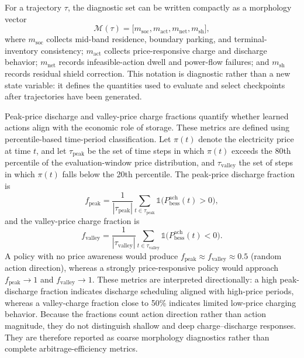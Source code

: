 For a trajectory $\tau$, the diagnostic set can be written compactly as a morphology vector
\begin{equation}
\mathcal{M}(\tau)=
\bigl[m_{\mathrm{soc}},m_{\mathrm{act}},m_{\mathrm{net}},m_{\mathrm{sh}}\bigr],
\label{eq:morphology_vector}
\end{equation}
where $m_{\mathrm{soc}}$ collects mid-band residence, boundary parking, and terminal-inventory consistency; $m_{\mathrm{act}}$ collects price-responsive charge and discharge behavior; $m_{\mathrm{net}}$ records infeasible-action dwell and power-flow failures; and $m_{\mathrm{sh}}$ records residual shield correction. This notation is diagnostic rather than a new state variable: it defines the quantities used to evaluate and select checkpoints after trajectories have been generated.

Peak-price discharge and valley-price charge fractions quantify whether learned actions align with the economic role of storage. These metrics are defined using percentile-based time-period classification. Let $\pi(t)$ denote the electricity price at time $t$, and let $\tau_{\mathrm{peak}}$ be the set of time steps in which $\pi(t)$ exceeds the 80th percentile of the evaluation-window price distribution, and $\tau_{\mathrm{valley}}$ the set of steps in which $\pi(t)$ falls below the 20th percentile. The peak-price discharge fraction is
\begin{equation}
f_{\mathrm{peak}} = \frac{1}{|\tau_{\mathrm{peak}}|} \sum_{t \in \tau_{\mathrm{peak}}} \mathbb{1}\bigl(P_{\mathrm{bess}}^{\mathrm{ach}}(t) > 0\bigr),
\label{eq:peak_discharge_fraction}
\end{equation}
and the valley-price charge fraction is
\begin{equation}
f_{\mathrm{valley}} = \frac{1}{|\tau_{\mathrm{valley}}|} \sum_{t \in \tau_{\mathrm{valley}}} \mathbb{1}\bigl(P_{\mathrm{bess}}^{\mathrm{ach}}(t) < 0\bigr).
\label{eq:valley_charge_fraction}
\end{equation}
A policy with no price awareness would produce $f_{\mathrm{peak}} \approx f_{\mathrm{valley}} \approx 0.5$ (random action direction), whereas a strongly price-responsive policy would approach $f_{\mathrm{peak}} \to 1$ and $f_{\mathrm{valley}} \to 1$. These metrics are interpreted directionally: a high peak-discharge fraction indicates discharge scheduling aligned with high-price periods, whereas a valley-charge fraction close to 50\% indicates limited low-price charging behavior. Because the fractions count action direction rather than action magnitude, they do not distinguish shallow and deep charge--discharge responses. They are therefore reported as coarse morphology diagnostics rather than complete arbitrage-efficiency metrics.

